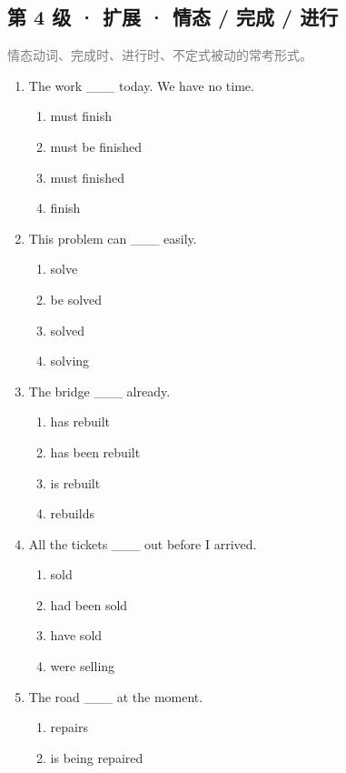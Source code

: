 \documentclass[11pt,a4paper]{ctexart}
\begin{document}
\subsection*{第 4 级 · 扩展 · 情态 / 完成 / 进行}
\noindent\textcolor{gray}{情态动词、完成时、进行时、不定式被动的常考形式。}\par\smallskip
\begin{enumerate}[leftmargin=*,itemsep=4pt]
\item The work \_\_\_ today. We have no time.
\begin{enumerate}[label=\Alph*.,leftmargin=2em,itemsep=1pt,topsep=2pt]
\item must finish
\item must be finished
\item must finished
\item finish
\end{enumerate}
\item This problem can \_\_\_ easily.
\begin{enumerate}[label=\Alph*.,leftmargin=2em,itemsep=1pt,topsep=2pt]
\item solve
\item be solved
\item solved
\item solving
\end{enumerate}
\item The bridge \_\_\_ already.
\begin{enumerate}[label=\Alph*.,leftmargin=2em,itemsep=1pt,topsep=2pt]
\item has rebuilt
\item has been rebuilt
\item is rebuilt
\item rebuilds
\end{enumerate}
\item All the tickets \_\_\_ out before I arrived.
\begin{enumerate}[label=\Alph*.,leftmargin=2em,itemsep=1pt,topsep=2pt]
\item sold
\item had been sold
\item have sold
\item were selling
\end{enumerate}
\item The road \_\_\_ at the moment.
\begin{enumerate}[label=\Alph*.,leftmargin=2em,itemsep=1pt,topsep=2pt]
\item repairs
\item is being repaired

\end{enumerate}
\end{enumerate}
\end{document}
